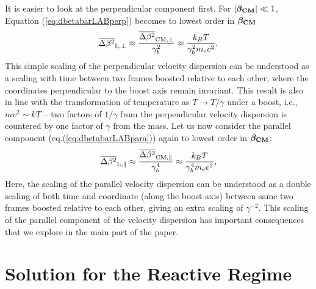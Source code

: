 \documentclass[usenatbib,iop,apj,numberedappendix]{aeb_emulateapj_2015}
\newcommand\bmath[1] {\mbox{\boldmath$\rm #1$}}
\newcommand{\betaCM}{\ensuremath{\bmath{\beta_{\rm CM}}}}
\newcommand{\dbetabarLABpara}{\ensuremath{\overline{\Delta\beta^2}_{\rm L, \parallel}}}
\newcommand{\dbetabarLABperp}{\ensuremath{\overline{\Delta\beta^2}_{\rm L, \perp}}}
\newcommand{\dbetabarCMpara}{\ensuremath{\overline{\Delta\beta^2}_{\rm CM, \parallel}}}
\newcommand{\dbetabarCMperp}{\ensuremath{\overline{\Delta\beta^2}_{\rm CM, \perp}}}
\begin{document}
\begin{appendix}
It is easier to look at the perpendicular component first.  For $\left|\betaCM\right| \ll 1$, Equation (\ref{eq:dbetabarLABperp}) becomes to lowest order in $\betaCM$ 
\begin{equation}
 \dbetabarLABperp \approx \frac{\dbetabarCMperp}{\gamma_b^2} \approx \frac {k_B T}{\gamma_b^2 m_e c^2 }.
\end{equation}
This simple scaling of the perpendicular velocity dispersion can be understood as a scaling with time between two frames boosted relative to each other, where the coordinates perpendicular to the boost axis remain invariant.  This result is also in line with the transformation of temperature as $T\rightarrow T/\gamma$ under a boost, i.e., $mv^2 \sim kT$ -- two factors of $1/\gamma$ from the perpendicular velocity dispersion is countered by one factor of $\gamma$ from the mass.  Let us now consider the parallel component (eq.(\ref{eq:dbetabarLABpara})) again to lowest order in $\betaCM$: 
\begin{equation}
 \dbetabarLABpara \approx \frac{\dbetabarCMpara}{\gamma_b^{4}}  \approx \frac {k_B T}{\gamma_b^4 m_e c^2 },
\end{equation}
Here, the scaling of the parallel velocity dispersion can be understood as a double scaling of both time and coordinate (along the boost axis) between same two frames boosted relative to each other, giving an extra scaling of $\gamma^{-2}$.
This scaling of the parallel component of the velocity dispersion has important consequences that we explore in the main part of the paper.  



\section{Solution for the Reactive Regime}\label{sec:solution reactive}


\end{appendix}
\end{document}
